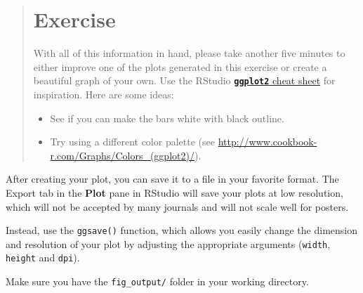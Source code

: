 \documentclass[]{book}
\providecommand{\tightlist}{%
  \setlength{\itemsep}{0pt}\setlength{\parskip}{0pt}}
\begin{document}
\begin{quote}
\section{Exercise}\label{exercise-15}

With all of this information in hand, please take another five minutes
to either improve one of the plots generated in this exercise or create
a beautiful graph of your own. Use the RStudio
\href{https://www.rstudio.com/wp-content/uploads/2016/11/ggplot2-cheatsheet-2.1.pdf}{\textbf{\texttt{ggplot2}}
cheat sheet} for inspiration. Here are some ideas:

\begin{itemize}
\tightlist
\item
  See if you can make the bars white with black outline.
\item
  Try using a different color palette (see
  \url{http://www.cookbook-r.com/Graphs/Colors_(ggplot2)/}).
\end{itemize}
\end{quote}

After creating your plot, you can save it to a file in your favorite
format. The Export tab in the \textbf{Plot} pane in RStudio will save
your plots at low resolution, which will not be accepted by many
journals and will not scale well for posters.

Instead, use the \texttt{ggsave()} function, which allows you easily
change the dimension and resolution of your plot by adjusting the
appropriate arguments (\texttt{width}, \texttt{height} and
\texttt{dpi}).

Make sure you have the \texttt{fig\_output/} folder in your working
directory.
\end{document}
